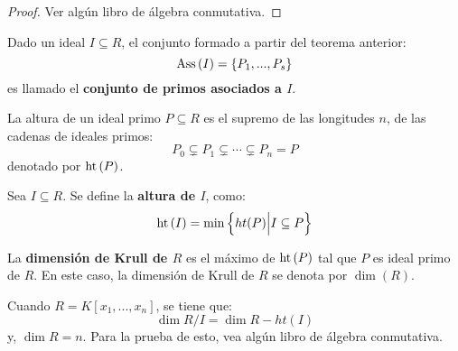 \documentclass[12pt]{report}
\newcounter{it}
\theoremstyle{largebreak}
\newcommand{\Ass}[1]{\ensuremath{\textup{Ass}\left(#1\right)}}
\newcommand{\het}[1]{\ensuremath{\textup{ht}\left(#1\right)}}
\begin{document}
    \begin{proof}
        Ver algún libro de álgebra conmutativa.
    \end{proof}

    \begin{mydef}
        Dado un ideal $I\subseteq R$, el conjunto formado a partir del teorema anterior:
        \begin{equation*}
            \Ass{I}=\left\{P_1,...,P_s \right\}
        \end{equation*}
        es llamado el \textbf{conjunto de primos asociados a $I$}.
    \end{mydef}

    \begin{mydef}
        La altura de un ideal primo $P\subseteq R$ es el supremo de las longitudes $n$, de las cadenas de ideales primos:
        \begin{equation*}
            P_0\subsetneq P_1\subsetneq\cdots\subsetneq P_n=P
        \end{equation*}
        denotado por $\het{P}$.
    \end{mydef}

    \begin{mydef}
        Sea $I\subseteq R$. Se define la \textbf{altura de $I$}, como:
        \begin{equation*}
            \het{I}=\min\left\{ht(P)\Big|I\subseteq P \right\}
        \end{equation*}
    \end{mydef}


    \begin{mydef}
        La \textbf{dimensión de Krull de $R$} es el máximo de $\het{P}$ tal que $P$ es ideal primo de $R$. En este caso, la dimensión de Krull de $R$ se denota por $\dim(R)$.
    \end{mydef}

    Cuando $R=K[x_1,...,x_n]$, se tiene que:
    \begin{equation*}
        \dim R/I=\dim R-ht(I)
    \end{equation*}
    y, $\dim R=n$. Para la prueba de esto, vea algún libro de álgebra conmutativa.
\end{document}
